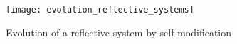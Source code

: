 \begin{figure}[!ht]
\begin{center}
\texttt{[image: evolution\_reflective\_systems]}
\caption{Evolution of a reflective system by self-modification\label{fig:evolution_reflective_systems}}
\end{center}
\end{figure}



